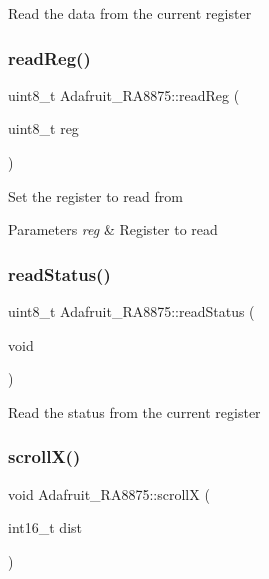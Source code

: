 Read the data from the current register \mbox{\label{class_adafruit___r_a8875_acff25414ab909c1c2dc7b5bf505fb2cf}} 
\subsubsection{\texorpdfstring{readReg()}{readReg()}}
{\footnotesize\ttfamily uint8\+\_\+t Adafruit\+\_\+\+R\+A8875\+::read\+Reg (\begin{DoxyParamCaption}\item[{uint8\+\_\+t}]{reg }\end{DoxyParamCaption})}

Set the register to read from


\begin{DoxyParams}{Parameters}
{\em reg} & Register to read \\
\hline
\end{DoxyParams}
\mbox{\label{class_adafruit___r_a8875_a6bc685b64b6cce6480af2054e7cabc14}} 
\subsubsection{\texorpdfstring{readStatus()}{readStatus()}}
{\footnotesize\ttfamily uint8\+\_\+t Adafruit\+\_\+\+R\+A8875\+::read\+Status (\begin{DoxyParamCaption}\item[{void}]{ }\end{DoxyParamCaption})}

Read the status from the current register \mbox{\label{class_adafruit___r_a8875_af4d86322451340de27f59de67ae3a145}} 
\subsubsection{\texorpdfstring{scrollX()}{scrollX()}}
{\footnotesize\ttfamily void Adafruit\+\_\+\+R\+A8875\+::scrollX (\begin{DoxyParamCaption}\item[{int16\+\_\+t}]{dist }\end{DoxyParamCaption})}

